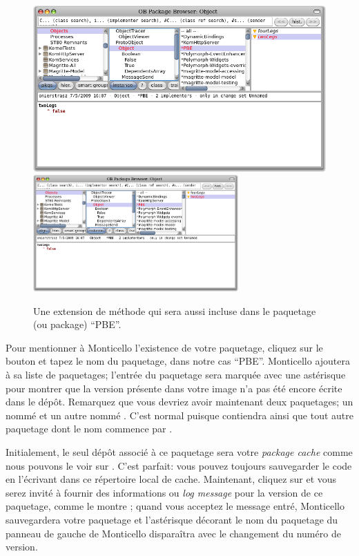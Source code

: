 \documentclass[a4paper,10pt,twoside]{book}
\begin{document}
\begin{figure}[btp]
	\begin{center}
	\ifluluelse
		{\includegraphics[width=\textwidth]{MCnewmethod}}
		{\includegraphics[width=0.7\textwidth]{MCnewmethod}}
	\end{center}
	\caption{Une extension de méthode qui sera aussi incluse dans le paquetage (ou package) ``PBE''.}
\end{figure}

Pour mentionner à Monticello l'existence de votre paquetage, 
cliquez sur le bouton  et tapez le nom du paquetage,
dans notre cas ``PBE''.
Monticello ajoutera  à sa liste de paquetages;
l'entrée du paquetage sera marquée avec une astérisque pour
montrer que la version présente dans votre image n'a pas
été encore écrite dans le dépôt.
Remarquez que vous devriez avoir maintenant deux paquetages;
un nommé  et un autre nommé . C'est
normal puisque  contiendra  ainsi que
tout autre paquetage dont le nom commence par . %

Initialement, le seul dépôt associé à ce paquetage sera votre
\emph{package cache} comme nous pouvons le voir sur .
C'est parfait: vous pouvez toujours sauvegarder le code en l'écrivant
dans ce répertoire local de cache.
Maintenant, cliquez sur  et vous serez invité à
fournir des informations ou \emph{log message} pour la version de ce 
paquetage, comme le montre ; 
quand vous acceptez le message entré, Monticello sauvegardera votre paquetage
et l'astérisque décorant le nom du paquetage du panneau de gauche
de Monticello disparaîtra avec le changement du numéro de version.
\end{document}
